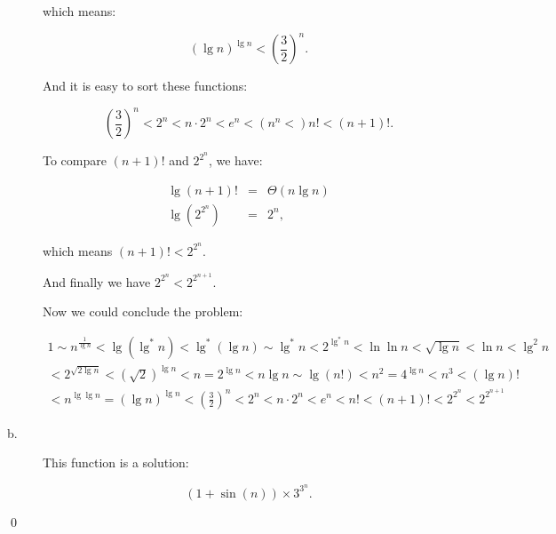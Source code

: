 \begin{description}
which means:

$$ (\lg n)^{\lg n} < \left(\frac{3}{2}\right) ^ n.$$

And it is easy to sort these functions:

$$ \left(\frac{3}{2}\right)^n < 2^n < n \cdot 2^n < e^n < ( n^n  <) n!  < (n + 1)!.$$

To compare $(n + 1)!$ and $2^{2^n}$, we have:

\begin{eqnarray*}
\lg (n + 1)! &=& \Theta(n \lg n)\\
\lg \left(2^{2^n}\right) &=& 2^n,
\end{eqnarray*}

which means $(n + 1)! < 2^{2^n}$.

And finally we have $2^{2^n} < 2^{2^{n + 1}}$.

Now we could conclude the problem:

\begin{eqnarray*}
1 \sim n^{\frac{1}{\lg n}} < \lg \left(\lg^*n\right) < \lg^*\left(\lg n\right) \sim \lg^* n < 2^{\lg^* n} < \ln\ln n < \sqrt{\lg n} < \ln n < \lg^2 n\\
< 2^{\sqrt{2\lg n}} < \left(\sqrt 2\right) ^ {\lg n} < n = 2^{\lg n}  < n\lg n \sim \lg \left(n!\right) < n^2 = 4^{\lg n}< n^3  < (\lg n)!\\
< n^{\lg \lg n} = \left(\lg n \right)^{\lg n} < \left(\frac{3}{2}\right)^n < 2^n < n\cdot 2^n < e^n < n! < (n + 1)! < 2^{2^n} < 2^{2^{n + 1}}
\end{eqnarray*}

\item[b. \hspace{9pt}] This function is a solution:

$$(1 + \sin(n)) \times 3^{3^n}.$$

\end{description}
\qed



